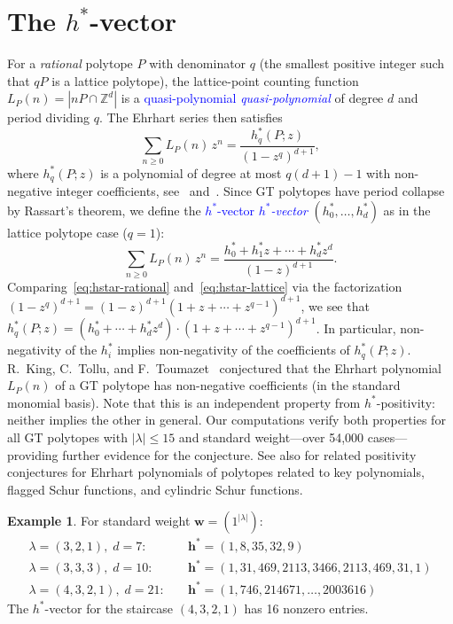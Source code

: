 \documentclass[11pt,reqno]{amsart}
\theoremstyle{definition}
\newtheorem{example}[theorem]{Example}
\newcommand{\setZ}{\mathbb{Z}}
\newcommand{\lam}{\lambda}
\newcommand{\wt}{\mathbf{w}}
\newcommand{\Ehr}{L}
\newcommand{\hvec}{\mathbf{h}^{*}}
\newcommand{\defin}[1]{%
\relax\ifmmode%
\textcolor{blue}{#1}%
\else \textcolor{blue}{\emph{#1}}%
\fi%
}
\begin{document}
\section{The \texorpdfstring{$h^{*}$}{h*}-vector}\label{sec:hstar}

For a \emph{rational} polytope $P$ with denominator $q$
(the smallest positive integer such that $qP$ is a lattice polytope),
the lattice-point counting function $\Ehr_P(n) = |nP \cap \setZ^d|$ is a
\defin{quasi-polynomial} of degree $d$ and period dividing $q$.
The Ehrhart series then satisfies
\begin{equation}\label{eq:hstar-rational}
  \sum_{n \geq 0} \Ehr_P(n) \, z^n
  = \frac{h^*_q(P;z)}{(1-z^q)^{d+1}},
\end{equation}
where $h^*_q(P;z)$ is a polynomial of degree at most $q(d+1)-1$
with non-negative integer coefficients,
see~\cite{BeckSottile2007} and~\cite{Stanley1993}.
Since GT polytopes have period collapse by Rassart's theorem,
we define the \defin{$h^{*}$-vector} $(h^*_0, \dotsc, h^*_d)$
as in the lattice polytope case ($q=1$):
\begin{equation}\label{eq:hstar-lattice}
  \sum_{n \geq 0} \Ehr_P(n) \, z^n
  = \frac{h^*_0 + h^*_1 z + \dotsb + h^*_d z^d}{(1-z)^{d+1}}.
\end{equation}
Comparing~\eqref{eq:hstar-rational} and~\eqref{eq:hstar-lattice}
via the factorization
$(1-z^q)^{d+1} = (1-z)^{d+1}(1+z+\dotsb+z^{q-1})^{d+1}$,
we see that
$h^*_q(P;z) = (h^*_0 + \dotsb + h^*_d z^d) \cdot (1+z+\dotsb+z^{q-1})^{d+1}$.
In particular, non-negativity of the $h^*_i$
implies non-negativity of the coefficients of $h^*_q(P;z)$.
R.~King, C.~Tollu, and F.~Toumazet~\cite{KingTolluToumazet2004}
conjectured that the Ehrhart polynomial $\Ehr_P(n)$ of a GT polytope
has non-negative coefficients (in the standard monomial basis).
Note that this is an independent property from $h^*$-positivity:
neither implies the other in general.
Our computations verify both properties for all GT polytopes
with $|\lam| \leq 15$ and standard weight---over 54{,}000
cases---providing further evidence for the
conjecture. 
See also \cite{AlexanderssonAlhajjar2018,AlexanderssonOguz2023x}
for related positivity conjectures for Ehrhart polynomials
of polytopes related to key polynomials,
flagged Schur functions, and cylindric Schur functions.


\begin{example}\label{ex:hstarVectors}
For standard weight $\wt = (1^{|\lam|})$:
\begin{align*}
  \lam = (3,2,1),\; d=7: \quad & \hvec = (1, 8, 35, 32, 9) \\
  \lam = (3,3,3),\; d=10: \quad & \hvec = (1, 31, 469, 2113, 3466, 2113, 469, 31, 1) \\
  \lam = (4,3,2,1),\; d=21: \quad & \hvec = (1, 746, 214671, \dotsc, 2003616)
\end{align*}
The $h^*$-vector for the staircase $(4,3,2,1)$ has 16 nonzero entries.
\end{example}
\end{document}
